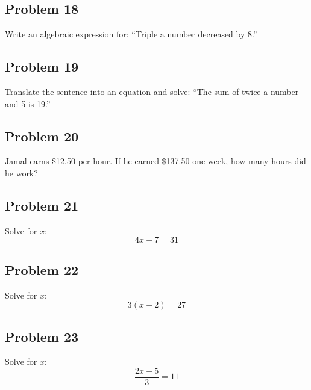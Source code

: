 \documentclass[12pt]{article}
\begin{document}
\subsection*{Problem 18}
Write an algebraic expression for:  
“Triple a number decreased by 8.”

\subsection*{Problem 19}
Translate the sentence into an equation and solve:  
“The sum of twice a number and 5 is 19.”

\subsection*{Problem 20}
Jamal earns \$12.50 per hour. If he earned \$137.50 one week, how many hours did he work?

\subsection*{Problem 21}
Solve for \(x\):  
\[
4x + 7 = 31
\]

\subsection*{Problem 22}
Solve for \(x\):  
\[
3(x - 2) = 27
\]

\subsection*{Problem 23}
Solve for \(x\):  
\[
\dfrac{2x - 5}{3} = 11
\]
\end{document}
